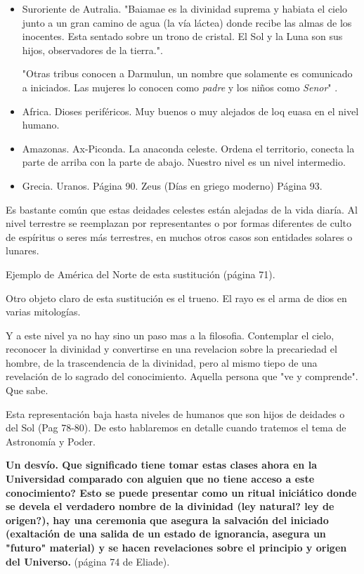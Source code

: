 \documentclass{report}
\begin{document}
\begin{itemize}
\item Suroriente de Autralia. "Baiamae es la divinidad suprema y
  habiata el cielo junto a un gran camino de agua (la v\'ia
  l\'actea) donde recibe las almas de los inocentes. Esta sentado
  sobre un trono de cristal. El Sol y la Luna son sus hijos,
  observadores de la tierra."\cite{Eliade}.

"Otras tribus conocen a Darmulun, un nombre que solamente es
  comunicado a iniciados. Las mujeres lo conocen como \emph{padre} y los
  ni\~nos como \emph{Senor}" \cite{Eliade}.

\item Africa. Dioses perif\'ericos. Muy buenos o muy alejados de loq
  euasa en el nivel humano.

\item Amazonas. Ax-Piconda. La anaconda celeste. Ordena el territorio,
  conecta la parte de arriba con la parte de abajo. Nuestro nivel es
  un nivel intermedio. 

\item Grecia. Uranos. P\'agina 90. Zeus (D\'ias en griego moderno)
  P\'agina 93.
\end{itemize}

Es bastante com\'un que estas deidades celestes est\'an alejadas de la
vida diar\'ia. Al nivel terrestre se reemplazan por representantes o
por formas diferentes de  culto de esp\'iritus o seres m\'as
terrestres, en muchos otros casos son entidades solares o lunares. 

Ejemplo de Am\'erica del Norte de esta sustituci\'on (p\'agina 71).

Otro objeto claro de esta sustituci\'on es el trueno.  El rayo es el
arma de dios en varias mitolog\'ias. 

Y a este nivel ya no hay sino un paso mas a la filosofia. Contemplar
el cielo, reconocer la divinidad y convertirse en una revelacion sobre
la precariedad el hombre, de la trascendencia de la divinidad, pero al
mismo tiepo de una revelaci\'on de lo sagrado del
conocimiento. Aquella persona que "ve y comprende". Que sabe.

Esta representaci\'on baja hasta niveles de humanos que son hijos de
deidades o del Sol \cite{Eliade} (Pag 78-80). De esto hablaremos en
detalle cuando tratemos el tema de Astronom\'ia y Poder.


{\bf Un desv\'io. Que significado tiene tomar estas clases ahora en la
Universidad comparado con alguien que no tiene acceso a este
conocimiento?
Esto se puede presentar como un ritual inici\'atico donde se devela el
verdadero nombre de la divinidad (ley natural? ley de origen?), hay
una ceremonia que asegura la salvaci\'on del iniciado (exaltaci\'on de
una salida de un estado de ignorancia, asegura un "futuro" material) y se hacen
revelaciones sobre el principio y origen del Universo. }(p\'agina 74
de Eliade). 
 
\end{document}
